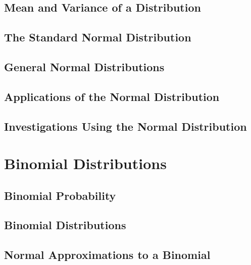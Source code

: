 \documentclass[12pt]{article}
\begin{document}
\subsection{Mean and Variance of a Distribution}


\subsection{The Standard Normal Distribution}


\subsection{General Normal Distributions}


\subsection{Applications of the Normal Distribution}


\subsection{Investigations Using the Normal Distribution}


\section{Binomial Distributions}

\subsection{Binomial Probability}


\subsection{Binomial Distributions}


\subsection{Normal Approximations to a Binomial}

\end{document}
